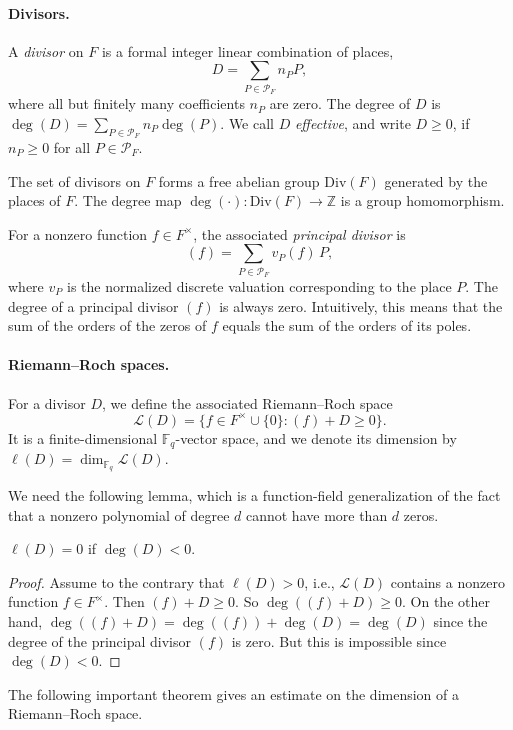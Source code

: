 \documentclass[11pt]{article}
\begin{document}
\paragraph{Divisors.}
A \emph{divisor} on $F$ is a formal integer linear combination of places,
\[
D = \sum_{P \in \mathcal{P}_F} n_P P,
\]
where all but finitely many coefficients $n_P$ are zero.
The degree of $D$ is $\deg(D) = \sum_{P\in \mathcal{P}_F}  n_P \deg(P)$. We call $D$ \emph{effective}, and write
$D\ge 0$, if $n_P\ge 0$ for all $P\in\mathcal{P}_F$.

The set of divisors on $F$ forms a free abelian group $\mathrm{Div}(F)$ generated by the places of $F$.
The degree map $\deg(\cdot):\mathrm{Div}(F) \to \mathbb{Z}$ is a group homomorphism.

For a nonzero function $f \in F^\times$, the associated \emph{principal divisor} is
\[
(f)=\sum_{P \in \mathcal{P}_F} v_P(f)\, P,
\]
where $v_P$ is the normalized discrete valuation corresponding to the place $P$. The degree of a principal divisor $(f)$ is always zero. Intuitively, this means that the sum of the orders of the zeros of $f$ equals the sum of the orders of its poles.

\paragraph{Riemann--Roch spaces.}
For a divisor $D$, we define the associated Riemann--Roch space
\[
\mathcal{L}(D)=\{f\in F^\times\cup\{0\} : (f)+D \ge 0\}.
\]
It is a finite-dimensional $\mathbb{F}_q$-vector space, and we denote its
dimension by $\ell(D)=\dim_{\mathbb{F}_q}\mathcal{L}(D)$.

We need the following lemma, which is a function-field generalization of the fact
that a nonzero polynomial of degree $d$ cannot have more than $d$ zeros.

\begin{lemma}\label{lem:zero-section}
$\ell(D)=0$ if $\deg(D)<0$.
\end{lemma}
\begin{proof}
Assume to the contrary that $\ell(D)>0$, i.e., $\mathcal{L}(D)$ contains a nonzero function $f\in F^\times$. Then $(f)+D\geq 0$. So $\deg((f)+D)\geq 0$. On the other hand, $\deg((f)+D)=\deg((f))+\deg(D)=\deg(D)$ since the degree of the principal divisor $(f)$ is zero. But this is impossible since $\deg(D)<0$.
\end{proof}

The following important theorem gives an estimate on the dimension of a Riemann--Roch space.
\end{document}
